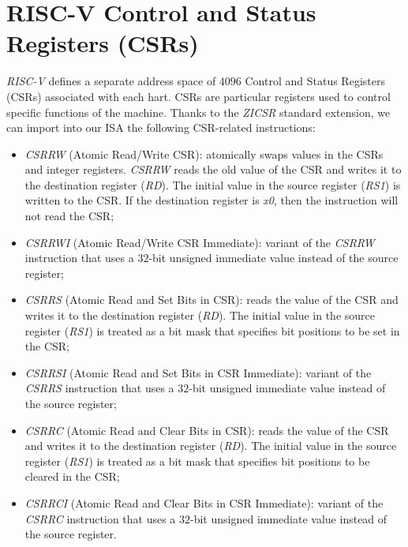 \section{RISC-V Control and Status Registers (CSRs)}
\label{sec:riscv_csrs}

\textit{RISC-V} defines a separate address space of $4096$ Control and Status Registers
(CSRs) associated with each hart. CSRs are particular registers used to control
specific functions of the machine. Thanks to the \textit{ZICSR} standard
extension, we can import into our ISA the following CSR-related instructions:
\begin{itemize}
  \item \textit{CSRRW} (Atomic Read/Write CSR): atomically swaps values in the CSRs
    and integer registers. \textit{CSRRW} reads the old value of the CSR and writes
    it to the destination register (\textit{RD}). The initial value in the source
    register (\textit{RS1}) is written to the CSR. If the destination register is
    \textit{x0}, then the instruction will not read the CSR;

  \item \textit{CSRRWI} (Atomic Read/Write CSR Immediate): variant of the \textit{CSRRW}
    instruction that uses a $32$-bit unsigned immediate value instead of the
    source register;

  \item \textit{CSRRS} (Atomic Read and Set Bits in CSR): reads the value of the
    CSR and writes it to the destination register (\textit{RD}). The initial value
    in the source register (\textit{RS1}) is treated as a bit mask that
    specifies bit positions to be set in the CSR;

  \item \textit{CSRRSI} (Atomic Read and Set Bits in CSR Immediate): variant of the
    \textit{CSRRS} instruction that uses a $32$-bit unsigned immediate value
    instead of the source register;

  \item \textit{CSRRC} (Atomic Read and Clear Bits in CSR): reads the value of the
    CSR and writes it to the destination register (\textit{RD}). The initial value
    in the source register (\textit{RS1}) is treated as a bit mask that
    specifies bit positions to be cleared in the CSR;

  \item \textit{CSRRCI} (Atomic Read and Clear Bits in CSR Immediate): variant of
    the \textit{CSRRC} instruction that uses a $32$-bit unsigned immediate value
    instead of the source register.
\end{itemize}

